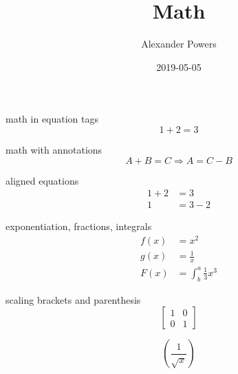 \documentclass{article}
\title{Math}
\author{Alexander Powers}
\date{2019-05-05}
\begin{document}
\maketitle

math in equation tags
\begin{equation*}
  1 + 2 = 3 
\end{equation*}

math with annotations
\begin{equation}
  A + B = C \Rightarrow A = C - B 
\end{equation}


aligned equations
\begin{align*}
  1 + 2 &= 3 \\
  1 &= 3 - 2
\end{align*}

exponentiation, fractions, integrals
\begin{align*}
  f(x) &= x^2\\
  g(x) &= \frac{1}{x}\\
  F(x) &= \int^a_b \frac{1}{3}x^3
\end{align*}

scaling brackets and parenthesis
\begin{equation}
\left[
\begin{matrix}
1 & 0\\
0 & 1
\end{matrix}
\right]
\end{equation}

\begin{equation}
\left(\frac{1}{\sqrt{x}}\right) 
\end{equation}
\end{document}
